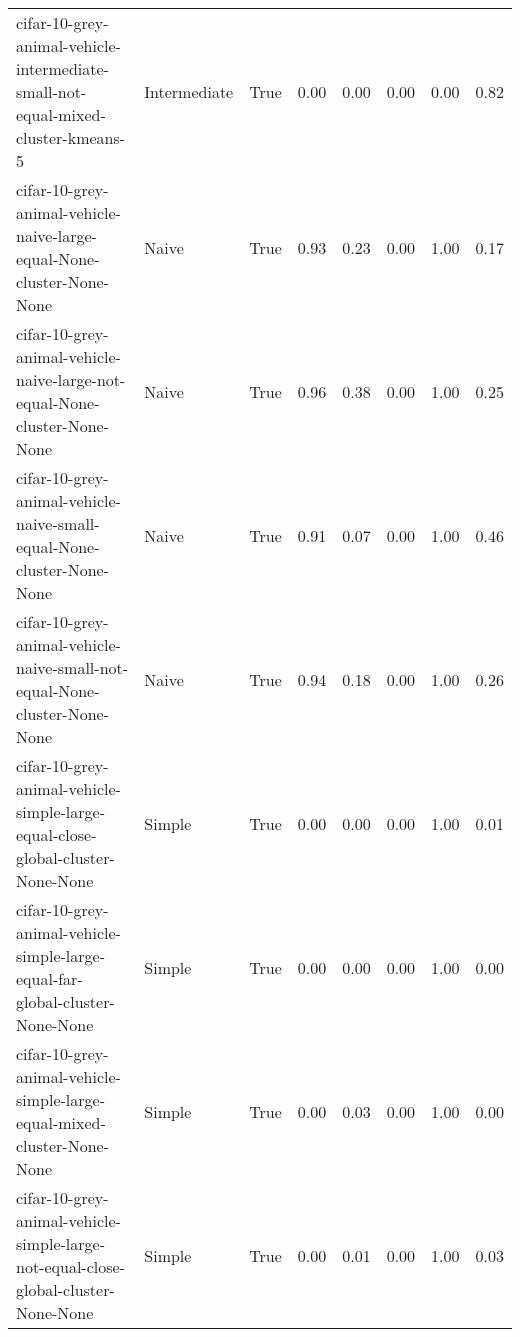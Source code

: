 \begin{longtable}{llllllll}
       cifar-10-grey-animal-vehicle-intermediate-small-not-equal-mixed-cluster-kmeans-5 & Intermediate &        True &                 0.00 &                 0.00 &                         0.00 &                         0.00 &                         0.82 \\
                  cifar-10-grey-animal-vehicle-naive-large-equal-None-cluster-None-None &        Naive &        True &                 0.93 &                 0.23 &                         0.00 &                         1.00 &                         0.17 \\
              cifar-10-grey-animal-vehicle-naive-large-not-equal-None-cluster-None-None &        Naive &        True &                 0.96 &                 0.38 &                         0.00 &                         1.00 &                         0.25 \\
                  cifar-10-grey-animal-vehicle-naive-small-equal-None-cluster-None-None &        Naive &        True &                 0.91 &                 0.07 &                         0.00 &                         1.00 &                         0.46 \\
              cifar-10-grey-animal-vehicle-naive-small-not-equal-None-cluster-None-None &        Naive &        True &                 0.94 &                 0.18 &                         0.00 &                         1.00 &                         0.26 \\
         cifar-10-grey-animal-vehicle-simple-large-equal-close-global-cluster-None-None &       Simple &        True &                 0.00 &                 0.00 &                         0.00 &                         1.00 &                         0.01 \\
           cifar-10-grey-animal-vehicle-simple-large-equal-far-global-cluster-None-None &       Simple &        True &                 0.00 &                 0.00 &                         0.00 &                         1.00 &                         0.00 \\
                cifar-10-grey-animal-vehicle-simple-large-equal-mixed-cluster-None-None &       Simple &        True &                 0.00 &                 0.03 &                         0.00 &                         1.00 &                         0.00 \\
     cifar-10-grey-animal-vehicle-simple-large-not-equal-close-global-cluster-None-None &       Simple &        True &                 0.00 &                 0.01 &                         0.00 &                         1.00 &                         0.03 \\

\end{longtable}
